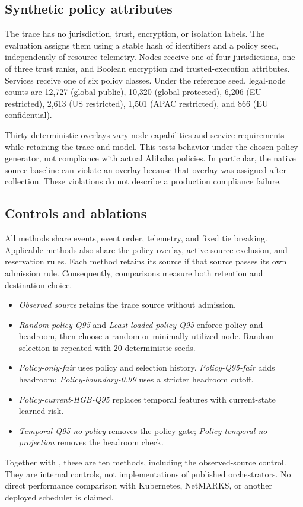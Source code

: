 \subsection{Synthetic policy attributes}\label{sec:policyoverlay}
The trace has no jurisdiction, trust, encryption, or isolation labels.
The evaluation assigns them using a stable hash of identifiers and a policy
seed, independently of resource telemetry. Nodes receive one of four
jurisdictions, one of three trust ranks, and Boolean encryption and
trusted-execution attributes. Services receive one of six policy classes.
Under the reference seed, legal-node counts are 12,727 (global public),
10,320 (global protected), 6,206 (EU restricted), 2,613 (US restricted),
1,501 (APAC restricted), and 866 (EU confidential).

Thirty deterministic overlays vary node capabilities and service
requirements while retaining the trace and model. This tests behavior
under the chosen policy generator, not compliance with actual Alibaba
policies. In particular, the native source baseline can violate an overlay
because that overlay was assigned after collection. These violations do
not describe a production compliance failure.

\subsection{Controls and ablations}
All methods share events, event order, telemetry, and fixed tie breaking.
Applicable methods also share the policy overlay, active-source exclusion,
and reservation rules. Each method retains its source if that source passes
its own admission rule. Consequently, comparisons measure both retention
and destination choice.

\begin{itemize}[leftmargin=*]
\item \emph{Observed source} retains the trace source without admission.
\item \emph{Random-policy-Q95} and \emph{Least-loaded-policy-Q95} enforce
policy and headroom, then choose a random or minimally utilized node.
Random selection is repeated with 20 deterministic seeds.
\item \emph{Policy-only-fair} uses policy and selection history.
\emph{Policy-Q95-fair} adds headroom; \emph{Policy-boundary-0.99} uses a
stricter headroom cutoff.
\item \emph{Policy-current-HGB-Q95} replaces temporal features with
current-state learned risk.
\item \emph{Temporal-Q95-no-policy} removes the policy gate;
\emph{Policy-temporal-no-projection} removes the headroom check.
\end{itemize}
Together with \cage, these are ten methods, including the observed-source
control. They are internal controls, not implementations of published
orchestrators. No direct performance comparison with Kubernetes, NetMARKS,
or another deployed scheduler is claimed.

